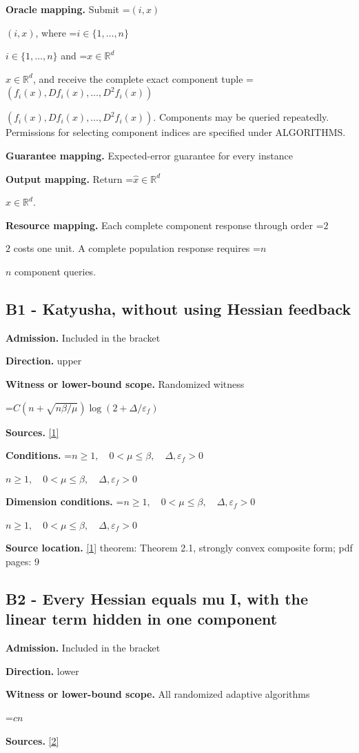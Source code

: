 \documentclass[10pt,a4paper]{article}
\newcommand{\AtlasMath}[1]{\par\begingroup\centering\setbox0=\hbox{$\displaystyle #1$}\ifdim\wd0>1.4\linewidth\typeout{ATLAS WIDE FORMULA: \the\wd0}\fi\ifdim\wd0>\linewidth\resizebox{\linewidth}{!}{\box0}\else\box0\fi\par\endgroup}
\newcommand{\AtlasInlineMath}[1]{\begingroup\setbox0=\hbox{$#1$}\ifdim\wd0>.4\linewidth\endgroup\AtlasMath{#1}\else\endgroup$#1$\fi}
\begin{document}
\textbf{Oracle mapping.} Submit \AtlasInlineMath{(i,x)}, where \AtlasInlineMath{i\in\{1,\ldots,n\}} and \AtlasInlineMath{x\in\mathbb{R}^d}, and receive the complete exact component tuple \AtlasInlineMath{(f_i(x),Df_i(x),\ldots,D^{2}f_i(x))}. Components may be queried repeatedly. Permissions for selecting component indices are specified under ALGORITHMS.

\textbf{Guarantee mapping.} Expected-error guarantee for every instance

\textbf{Output mapping.} Return \AtlasInlineMath{\widehat{x}\in \mathbb{R}^d}.

\textbf{Resource mapping.} Each complete component response through order \AtlasInlineMath{2} costs one unit. A complete population response requires \AtlasInlineMath{n} component queries.

\subsection{B1 - Katyusha, without using Hessian feedback}
\textbf{Admission.} Included in the bracket

\textbf{Direction.} upper

\textbf{Witness or lower-bound scope.} Randomized witness

\AtlasMath{C(n+\sqrt{n\beta/\mu})\log(2+\Delta/\varepsilon_f)}
\textbf{Sources.} \href{https://jmlr.org/papers/volume18/16-410/16-410.pdf}{[1]}

\textbf{Conditions.} \AtlasInlineMath{n\ge1,\quad0<\mu\le\beta,\quad\Delta,\varepsilon_f>0}

\textbf{Dimension conditions.} \AtlasInlineMath{n\ge1,\quad0<\mu\le\beta,\quad\Delta,\varepsilon_f>0}

\textbf{Source location.} \href{https://jmlr.org/papers/volume18/16-410/16-410.pdf}{[1]} theorem: Theorem 2.1, strongly convex composite form; pdf pages: 9

\subsection{B2 - Every Hessian equals mu I, with the linear term hidden in one component}
\textbf{Admission.} Included in the bracket

\textbf{Direction.} lower

\textbf{Witness or lower-bound scope.} All randomized adaptive algorithms

\AtlasMath{cn}
\textbf{Sources.} \href{https://proceedings.mlr.press/v70/arjevani17a/arjevani17a.pdf}{[2]}
\end{document}
